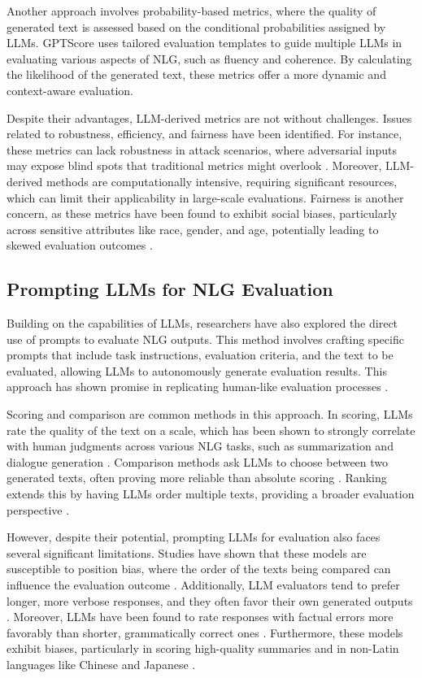 Another approach involves probability-based metrics, where the quality of generated text is assessed based on the conditional probabilities assigned by LLMs. GPTScore \cite{fu2023gptscore} uses tailored evaluation templates to guide multiple LLMs in evaluating various aspects of NLG, such as fluency and coherence. By calculating the likelihood of the generated text, these metrics offer a more dynamic and context-aware evaluation.

Despite their advantages, LLM-derived metrics are not without challenges. Issues related to robustness, efficiency, and fairness have been identified. For instance, these metrics can lack robustness in attack scenarios, where adversarial inputs may expose blind spots that traditional metrics might overlook \cite{he2022blind}. Moreover, LLM-derived methods are computationally intensive, requiring significant resources, which can limit their applicability in large-scale evaluations. Fairness is another concern, as these metrics have been found to exhibit social biases, particularly across sensitive attributes like race, gender, and age, potentially leading to skewed evaluation outcomes \cite{sun2022bertscore}.

\subsection{Prompting LLMs for NLG Evaluation}

Building on the capabilities of LLMs, researchers have also explored the direct use of prompts to evaluate NLG outputs. This method involves crafting specific prompts that include task instructions, evaluation criteria, and the text to be evaluated, allowing LLMs to autonomously generate evaluation results. This approach has shown promise in replicating human-like evaluation processes \cite{gao2024llm}.

Scoring and comparison are common methods in this approach. In scoring, LLMs rate the quality of the text on a scale, which has been shown to strongly correlate with human judgments across various NLG tasks, such as summarization and dialogue generation \cite{chiang2023can}. Comparison methods ask LLMs to choose between two generated texts, often proving more reliable than absolute scoring \cite{luo2023chatgpt}. Ranking extends this by having LLMs order multiple texts, providing a broader evaluation perspective \cite{ji2023exploring}.

However, despite their potential, prompting LLMs for evaluation also faces several significant limitations. Studies have shown that these models are susceptible to position bias, where the order of the texts being compared can influence the evaluation outcome \cite{wang2023large}. Additionally, LLM evaluators tend to prefer longer, more verbose responses, and they often favor their own generated outputs \cite{zheng2024judging, liu2023g}. Moreover, LLMs have been found to rate responses with factual errors more favorably than shorter, grammatically correct ones \cite{wu2023style}. Furthermore, these models exhibit biases, particularly in scoring high-quality summaries and in non-Latin languages like Chinese and Japanese \cite{hada2023large}.

